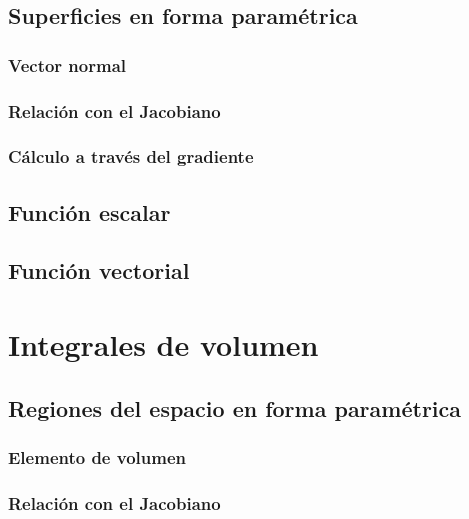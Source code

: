 \documentclass[12pt, fleqn]{report}                             %
\theoremstyle{break}                                            %
\begin{document}
            \subsection{Superficies en forma paramétrica}
            
                \subsubsection{Vector normal}
            
                \subsubsection{Relación con el Jacobiano}
                
                \subsubsection{Cálculo a través del gradiente}
            
            \subsection{Función escalar}
            
            \subsection{Función vectorial}
        
        \section{Integrales de volumen}
        
            \subsection{Regiones del espacio en forma paramétrica}
            
                \subsubsection{Elemento de volumen}
                
                \subsubsection{Relación con el Jacobiano}
        
\end{document}
